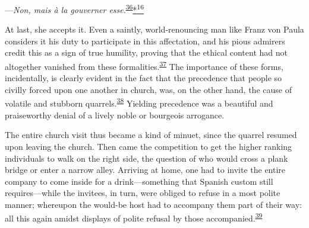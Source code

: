 ---\emph{Non, mais à la gouverner
esse}.\textsuperscript{\protect\hypertarget{09_Chapter_Two__THE_CRAVING_FOR_A_M.xhtmlux5cux23id_2015}{\protect\hyperlink{23_NOTES.xhtmlux5cux23id_2016}{36}}}\protect\hypertarget{09_Chapter_Two__THE_CRAVING_FOR_A_M.xhtmlux5cux23id_2439}{\protect\hyperlink{23_NOTES.xhtmlux5cux23id_2440}{*\textsuperscript{16}}}

At last, she accepts it. Even a saintly, world-renouncing man like Franz
von Paula considers it his duty to participate in this affectation, and
his pious admirers credit this as a sign of true humility, proving that
the ethical content had not altogether vanished from these
formalities.\textsuperscript{\protect\hypertarget{09_Chapter_Two__THE_CRAVING_FOR_A_M.xhtmlux5cux23id_2013}{\protect\hyperlink{23_NOTES.xhtmlux5cux23id_2014}{37}}}
The importance of these forms, incidentally, is clearly evident in the
fact that the precedence that people so civilly forced upon one another
in church, was, on the other hand, the cause of volatile and stubborn
quarrels.\textsuperscript{\protect\hypertarget{09_Chapter_Two__THE_CRAVING_FOR_A_M.xhtmlux5cux23id_2011}{\protect\hyperlink{23_NOTES.xhtmlux5cux23id_2012}{38}}}
Yielding precedence was a beautiful and praiseworthy denial of a lively
noble or bourgeois arrogance.

The entire church visit thus became a kind of minuet, since the quarrel
resumed upon leaving the church. Then came the competition to get the
higher ranking individuals to walk on the right side, the question of
who would cross a plank bridge or enter a narrow alley. Arriving at
home, one had to invite the entire company to come inside for a
drink---something that Spanish custom still requires---while the
invitees, in turn, were obliged to refuse in a most polite manner;
whereupon the would-be host had to accompany
\protect\hypertarget{09_Chapter_Two__THE_CRAVING_FOR_A_M.xhtmlux5cux23page_50}{}{}them
part of their way: all this again amidst displays of polite refusal by
those
accompanied.\textsuperscript{\protect\hypertarget{09_Chapter_Two__THE_CRAVING_FOR_A_M.xhtmlux5cux23id_2009}{\protect\hyperlink{23_NOTES.xhtmlux5cux23id_2010}{39}}}

